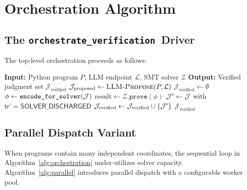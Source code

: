 \documentclass[11pt]{article}
\newcommand{\SolverDisch}{\ensuremath{\mathsf{SOLVER\_DISCHARGED}}}
\newcommand{\OrchestrateVerif}{\texttt{orchestrate\_verification}}
\newcommand{\tr}{\mathsf{tr}}                        %
\begin{document}
\section{Orchestration Algorithm}\label{sec:orchestration}

\subsection{The \OrchestrateVerif\ Driver}
The top-level orchestration proceeds as follows:

\begin{algorithm}[H]
\caption{LLM-Z3 Orchestration}
\label{alg:orchestration}
\begin{algorithmic}[1]
\STATE \textbf{Input:} Python program $P$, LLM endpoint $\mathcal{L}$, 
       SMT solver $\mathcal{Z}$
\STATE \textbf{Output:} Verified judgment set $\mathcal{J}_{\text{verified}}$
\STATE $\mathcal{J}_{\text{proposed}} \gets \textsc{LLM-Propose}(P, \mathcal{L})$
\STATE $\mathcal{J}_{\text{verified}} \gets \emptyset$
  \STATE $\phi \gets \texttt{encode\_for\_solver}(\mathcal{J})$
  \STATE $\text{result} \gets \mathcal{Z}.\texttt{prove}(\phi)$
    \STATE $\mathcal{J}' \gets \mathcal{J}$ with $\tr' = \SolverDisch$
    \STATE $\mathcal{J}_{\text{verified}} \gets \mathcal{J}_{\text{verified}} \cup \{\mathcal{J}'\}$
  \ENDIF
\ENDFOR
\RETURN $\mathcal{J}_{\text{verified}}$
\end{algorithmic}
\end{algorithm}

\subsection{Parallel Dispatch Variant}

When programs contain many independent coordinates, the sequential loop
in Algorithm~\ref{alg:orchestration} under-utilizes solver capacity.
Algorithm~\ref{alg:parallel} introduces parallel dispatch with a
configurable worker pool.
\end{document}
